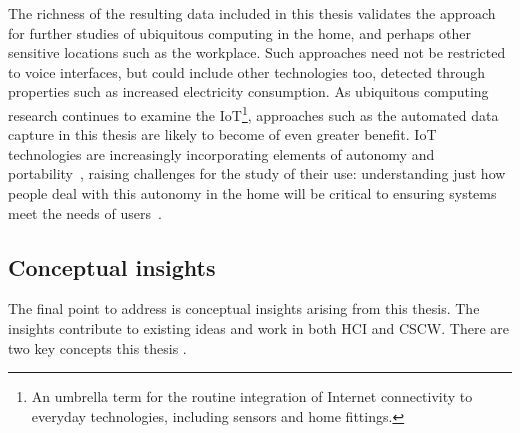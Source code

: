 \begin{corrections}
The richness of the resulting data included in this thesis validates the approach for further studies of ubiquitous computing in the home, and perhaps other sensitive locations such as the workplace.
Such approaches need not be restricted to voice interfaces, but could include other technologies too, detected through properties such as increased electricity consumption.
As ubiquitous computing research continues to examine the \acf{IoT}\footnote{An umbrella term for the routine integration of Internet connectivity to everyday technologies, including sensors and home fittings.}, approaches such as the automated data capture in this thesis are likely to become of even greater benefit.
\ac{IoT} technologies are increasingly incorporating elements of autonomy and portability~\citep{Fuentes2019a,Porcheron2015}, raising challenges for the study of their use: understanding just how people deal with this autonomy in the home will be critical to ensuring systems meet the needs of users~\citep{Crabtree2003}.
\end{corrections}






\subsection{Conceptual insights}\label{sec:synopsis conclusions concept}
\begin{revisedsubmission}
The final point to address is conceptual insights arising from this thesis.
The insights contribute to existing ideas and work in both \ac{HCI} and \ac{CSCW}.
There are two key concepts this thesis .
\end{revisedsubmission}

